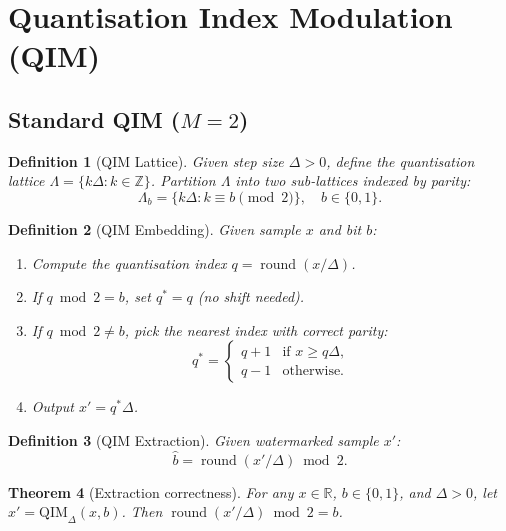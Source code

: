 \documentclass[11pt,a4paper]{article}
\newtheorem{theorem}{Theorem}[section]
\newtheorem{definition}[theorem]{Definition}
\newcommand{\R}{\mathbb{R}}
\newcommand{\Z}{\mathbb{Z}}
\DeclareMathOperator{\round}{round}
\begin{document}
\section{Quantisation Index Modulation (QIM)}
\label{sec:qim}

\subsection{Standard QIM ($M = 2$)}

\begin{definition}[QIM Lattice]
Given step size $\Delta > 0$, define the quantisation lattice
$\Lambda = \{ k\Delta : k \in \Z \}$.
Partition $\Lambda$ into two sub-lattices indexed by parity:
\[
    \Lambda_b = \{ k\Delta : k \equiv b \pmod{2} \}, \quad b \in \{0,1\}.
\]
\end{definition}

\begin{definition}[QIM Embedding]
Given sample $x$ and bit $b$:
\begin{enumerate}
    \item Compute the quantisation index $q = \round(x / \Delta)$.
    \item If $q \bmod 2 = b$, set $q^* = q$ (no shift needed).
    \item If $q \bmod 2 \neq b$, pick the nearest index with correct parity:
    \[
        q^* = \begin{cases}
            q + 1 & \text{if } x \geq q\Delta, \\
            q - 1 & \text{otherwise.}
        \end{cases}
    \]
    \item Output $x' = q^* \Delta$.
\end{enumerate}
\end{definition}

\begin{definition}[QIM Extraction]
Given watermarked sample $x'$:
\[
    \hat{b} = \round(x' / \Delta) \bmod 2.
\]
\end{definition}

\begin{theorem}[Extraction correctness]
\label{thm:qim-correct}
For any $x \in \R$, $b \in \{0,1\}$, and $\Delta > 0$, let $x' = \mathrm{QIM}_\Delta(x, b)$.
Then $\round(x' / \Delta) \bmod 2 = b$.
\end{theorem}
\end{document}
